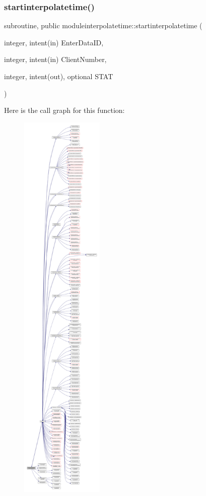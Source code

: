 \subsubsection{\texorpdfstring{startinterpolatetime()}{startinterpolatetime()}}
{\footnotesize\ttfamily subroutine, public moduleinterpolatetime\+::startinterpolatetime (\begin{DoxyParamCaption}\item[{integer, intent(in)}]{Enter\+Data\+ID,  }\item[{integer, intent(in)}]{Client\+Number,  }\item[{integer, intent(out), optional}]{S\+T\+AT }\end{DoxyParamCaption})}

Here is the call graph for this function\+:\nopagebreak
\begin{figure}[H]
\begin{center}
\leavevmode
\includegraphics[height=550pt]{namespacemoduleinterpolatetime_a9ee23aab51e3ce1e657af4c8074b2ae2_cgraph}
\end{center}
\end{figure}
